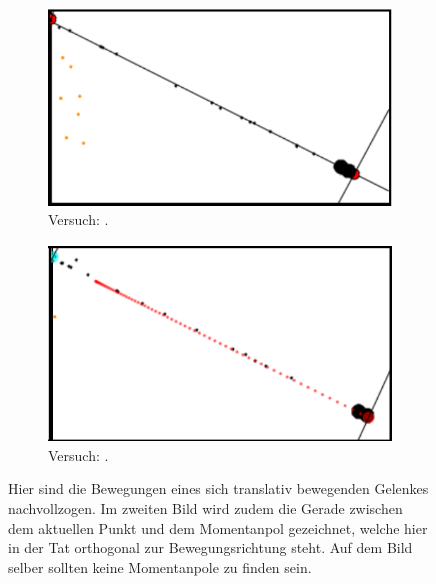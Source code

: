 \begin{figure}
    \centering
    \begin{subfigure}[t]{0.45\textwidth}
        \includegraphics[width=\textwidth]{gfx/translatives_glied_1.png}
        \caption{Versuch: .}\label{fig:translatives_glied_1}
    \end{subfigure}
    \begin{subfigure}[t]{0.45\textwidth}
        \includegraphics[width=\textwidth]{gfx/translatives_glied_3.png}
        \caption{Versuch: .}\label{fig:translatives_glied_3}
    \end{subfigure}
    \caption{Hier sind die Bewegungen eines sich translativ bewegenden Gelenkes nachvollzogen. Im zweiten Bild wird zudem die Gerade zwischen dem aktuellen Punkt und dem Momentanpol gezeichnet, welche hier in der Tat orthogonal zur Bewegungsrichtung steht. Auf dem Bild selber sollten keine Momentanpole zu finden sein.}
    \label{fig:translatives_glied_1_3}
\end{figure}



